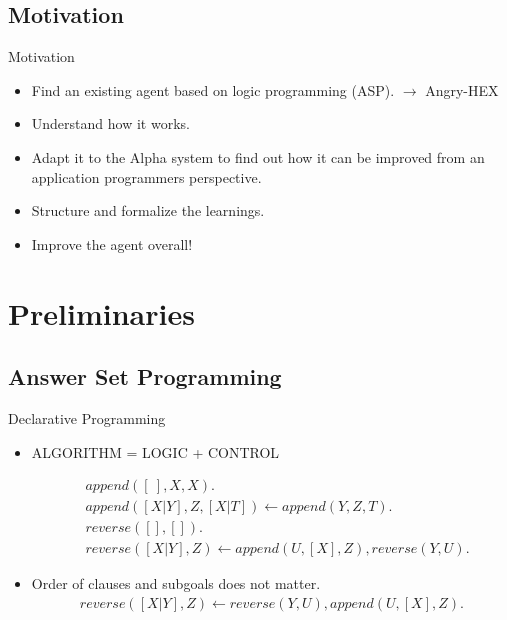 \documentclass[smaller,dvipsnames]{beamer}
\begin{document}
\subsection{Motivation}

\begin{frame}{Motivation}
	\begin{itemize}[<+->]
		\item Find an existing agent based on logic programming (ASP). \newline \(\rightarrow\) Angry-HEX
		\item Understand how it works.
		\item Adapt it to the Alpha system to find out how it can be improved from an application programmers perspective.
		\item Structure and formalize the learnings.
		\item Improve the agent overall!
	\end{itemize}
\end{frame}

\section{Preliminaries}

\subsection{Answer Set Programming}

\begin{frame}{Declarative Programming}
 	\begin{center}
 	\begin{itemize}
	\item<1->[] \begin{center} {\large{ALGORITHM = LOGIC + CONTROL}} \end{center}
		\begin{align*}
			&append ([\:], X, X). \\
			&append ([X|Y], Z, [X|T ]) \leftarrow append (Y, Z, T ). \\
			&reverse([ ], [ ]).\\
			&reverse([X|Y ], Z) \leftarrow append (U, [X], Z), reverse(Y, U ).
		\end{align*}
  \item<2>[] Order of clauses and subgoals does not matter.
  		\begin{align*}
			reverse([X|Y], Z) \leftarrow reverse(Y, U ), append (U, [X], Z).
		\end{align*}
	\end{itemize}	
	\end{center}
\end{frame}
\end{document}
